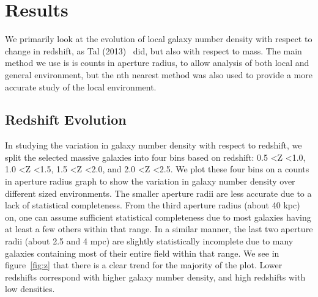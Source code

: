 \documentclass[apj]{emulateapj}
\begin{document}
\section{Results}

We primarily look at the evolution of local galaxy number density with respect to change in redshift, as Tal (2013)~\cite{2013ApJ...769...31T} did, but also with respect to mass. The main method we use is is counts in aperture radius, to allow analysis of both local and general environment, but the nth nearest method was also used to provide a more accurate study of the local environment.

\subsection{Redshift Evolution}

In studying the variation in galaxy number density with respect to redshift, we split the selected massive galaxies into four bins based on redshift: 0.5 \textless Z \textless 1.0, 1.0 \textless Z \textless 1.5, 1.5 \textless Z \textless 2.0, and 2.0 \textless Z \textless 2.5. We plot these four bins on a counts in aperture radius graph to show the variation in galaxy number density over different sized environments. The smaller aperture radii are less accurate due to a lack of statistical completeness. From the third aperture radius (about 40 kpc) on, one can assume sufficient statistical completeness due to most galaxies having at least a few others within that range. In a similar manner, the last two aperture radii (about 2.5 and 4 mpc) are slightly statistically incomplete due to many galaxies containing most of their entire field within that range. We see in figure~\ref{fig:z} that there is a clear trend for the majority of the plot. Lower redshifts correspond with higher galaxy number density, and high redshifts with low densities. 
\end{document}
